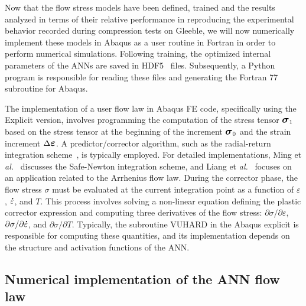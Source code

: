 \documentclass[algorithms,article,submit,pdftex,oneauthors]{Definitions/mdpi}
\makeatletter
\DeclareRobustCommand{\mdot}[1]{\accentset{\mbox{\bfseries .}}{#1}}
\DeclareRobustCommand{\eal}{et \emph{al.}\@\xspace}
\DeclareRobustCommand{\Sig}{\mbox{\large\ensuremath{\boldsymbol{\sigma}}}}
\DeclareRobustCommand{\Eps}{\mbox{\large\ensuremath{\boldsymbol{\varepsilon}}}}
\makeatother
\begin{document}
Now that the flow stress models have been defined, trained and the results analyzed in terms of their relative performance in reproducing the experimental behavior recorded during compression tests on Gleeble, we will now numerically implement these models in Abaqus as a user routine in Fortran in order to perform numerical simulations.
Following training, the optimized internal parameters of the ANNs are saved in HDF5~\cite{Koranne-2011-HDF} files.
Subsequently, a Python program is responsible for reading these files and generating the Fortran 77 subroutine for Abaqus.

The implementation of a user flow law in Abaqus FE code, specifically using the Explicit version, involves programming the computation of the stress tensor $\Sig_{1}$ based on the stress tensor at the beginning of the increment $\Sig_{0}$ and the strain increment $\Delta\Eps$.
A predictor/corrector algorithm, such as the radial-return integration scheme~\cite{Ponthot-2002-USU}, is typically employed.
For detailed implementations, Ming \eal~\cite{Ming-2018-ERV} discusses the Safe-Newton integration scheme, and Liang \eal~\cite{Liang-2022} focuses on an application related to the Arrhenius flow law.
During the corrector phase, the flow stress $\sigma$ must be evaluated at the current integration point as a function of $\varepsilon$, $\mdot{\varepsilon}$, and $T$.
This process involves solving a non-linear equation defining the plastic corrector expression and computing three derivatives of the flow stress: $\partial\sigma/\partial\varepsilon$, $\partial\sigma/\partial\mdot{\varepsilon}$, and $\partial\sigma/\partial T$.
Typically, the subroutine VUHARD in the Abaqus explicit is responsible for computing these quantities, and its implementation depends on the structure and activation functions of the ANN.

\subsection{Numerical implementation of the ANN flow law}\label{subsec:Num-impl}
\end{document}
